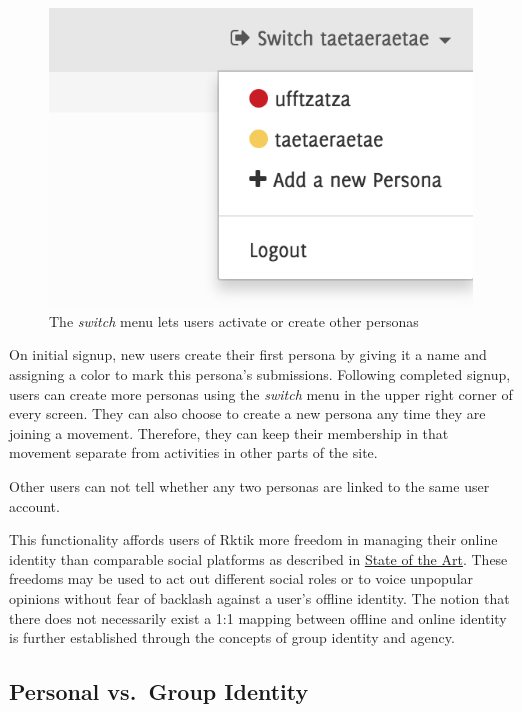 \begin{figure}[htbp]
\centering
\includegraphics{img/switch.png}
\caption{The \emph{switch} menu lets users activate or create other
personas}
\end{figure}

On initial signup, new users create their first persona by giving it a
name and assigning a color to mark this persona's submissions. Following
completed signup, users can create more personas using the \emph{switch}
menu in the upper right corner of every screen. They can also choose to
create a new persona any time they are joining a movement. Therefore,
they can keep their membership in that movement separate from activities
in other parts of the site.

Other users can not tell whether any two personas are linked to the same
user account.

This functionality affords users of Rktik more freedom in managing their
online identity than comparable social platforms as described in
\hyperref[state-of-the-art]{State of the Art}. These freedoms may be
used to act out different social roles or to voice unpopular opinions
without fear of backlash against a user's offline identity. The notion
that there does not necessarily exist a 1:1 mapping between offline and
online identity is further established through the concepts of group
identity and agency.

\subsection{Personal vs.~Group
Identity}\label{personal-vs.group-identity}

